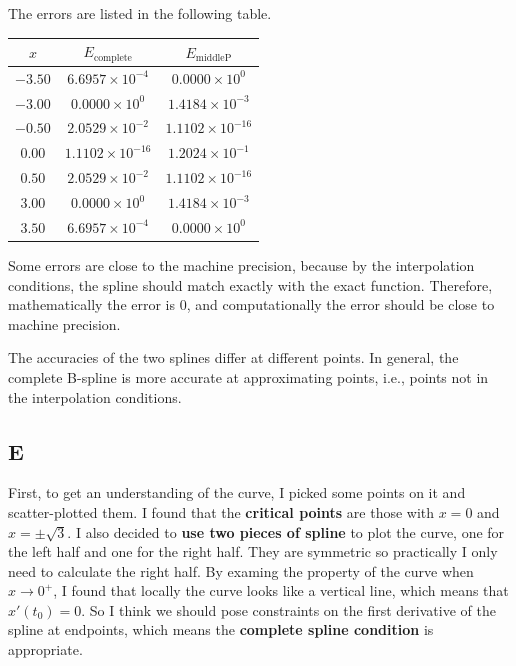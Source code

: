 \documentclass[12pt]{article}
\begin{document}
        The errors are listed in the following table.
        \begin{table}[H]
            \centering
            \begin{tabular}{c | c c}
                \(x\) & \(E_\text{complete}\) & \(E_\text{middleP}\) \\
                \hline
                \(-3.50\) & \(6.6957\times 10^{-4}\) & \(0.0000\times 10^{0}\) \\
                \(-3.00\) & \(0.0000\times 10^{0}\) & \(1.4184\times 10^{-3}\) \\
                \(-0.50\) & \(2.0529\times 10^{-2}\) & \(1.1102\times 10^{-16}\) \\
                \(0.00\) & \(1.1102\times 10^{-16}\) & \(1.2024\times 10^{-1}\) \\
                \(0.50\) & \(2.0529\times 10^{-2}\) & \(1.1102\times 10^{-16}\) \\
                \(3.00\) & \(0.0000\times 10^{0}\) & \(1.4184\times 10^{-3}\) \\
                \(3.50\) & \(6.6957\times 10^{-4}\) & \(0.0000\times 10^{0}\) \\
            \end{tabular}
        \end{table}

        Some errors are close to the machine precision, because by the
        interpolation conditions, the spline should match exactly with the exact function.
        Therefore, mathematically the error is \(0\), and computationally the 
        error should be close to machine precision.

        The accuracies of the two splines differ at different points. In general, 
        the complete B-spline is more accurate at approximating points, i.e., points
        not in the interpolation conditions.

    \subsection{E}

        First, to get an understanding of the curve, I picked some points 
        on it and scatter-plotted them. I found that the \textbf{critical points} are
        those with \(x=0\) and \(x=\pm \sqrt 3\). I also decided to \textbf{use two pieces of spline} to
        plot the curve, one for the left half and one for the right half. They are symmetric 
        so practically I only need to calculate the right half. By examing the property of
        the curve when \(x\to 0^+\), I found that locally the curve looks like a vertical line, 
        which means that \(x'(t_0)=0\). So I think we should pose constraints on the first 
        derivative of the spline at endpoints, which means the \textbf{complete spline condition} 
        is appropriate.
\end{document}
